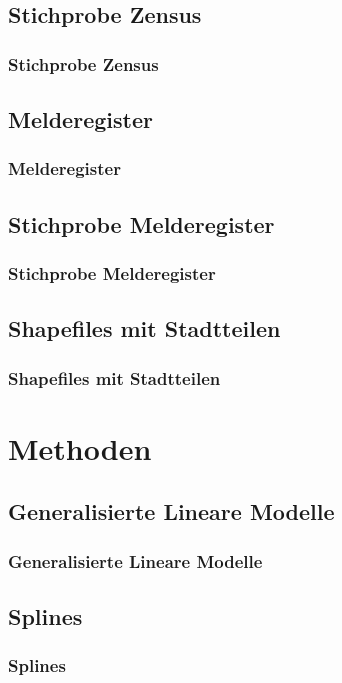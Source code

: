 \documentclass{beamer}
\begin{document}
\subsection{Stichprobe Zensus}
\begin{frame}\frametitle{Stichprobe Zensus}

\end{frame}

\subsection{Melderegister}
\begin{frame}\frametitle{Melderegister}

\end{frame}

\subsection{Stichprobe Melderegister}
\begin{frame}\frametitle{Stichprobe Melderegister}

\end{frame}



\subsection{Shapefiles mit Stadtteilen}
\begin{frame}\frametitle{Shapefiles mit Stadtteilen}

\end{frame}

\section{Methoden} 
\subsection{Generalisierte Lineare Modelle}
\begin{frame}
\frametitle{Generalisierte Lineare Modelle}

\end{frame}

\subsection{Splines}
\begin{frame}
\frametitle{Splines}

\end{frame}
\end{document}

